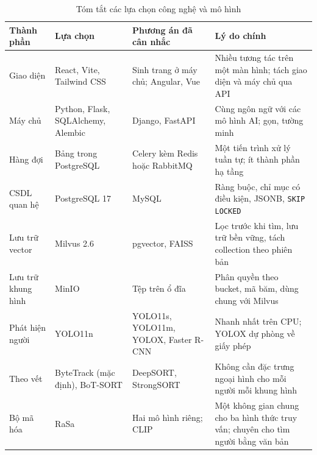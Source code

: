 \begin{table}[H]
\centering
\caption{Tóm tắt các lựa chọn công nghệ và mô hình}
\label{tab:tech-summary}
\begin{tabularx}{\textwidth}{|>{\raggedright\arraybackslash}p{3.0cm}|>{\raggedright\arraybackslash}p{3.1cm}|>{\raggedright\arraybackslash}p{3.4cm}|L|}
\hline
\textbf{Thành phần} & \textbf{Lựa chọn} & \textbf{Phương án đã cân nhắc} & \textbf{Lý do chính} \\
\hline
Giao diện & React, Vite, Tailwind CSS & Sinh trang ở máy chủ; Angular, Vue & Nhiều tương tác trên một màn hình; tách giao diện và máy chủ qua API \\
\hline
Máy chủ & Python, Flask, SQLAlchemy, Alembic & Django, FastAPI & Cùng ngôn ngữ với các mô hình AI; gọn, tường minh \\
\hline
Hàng đợi & Bảng trong PostgreSQL & Celery kèm Redis hoặc RabbitMQ & Một tiến trình xử lý tuần tự; ít thành phần hạ tầng \\
\hline
CSDL quan hệ & PostgreSQL 17 & MySQL & Ràng buộc, chỉ mục có điều kiện, JSONB, \texttt{SKIP LOCKED} \\
\hline
Lưu trữ vector & Milvus 2.6 & pgvector, FAISS & Lọc trước khi tìm, lưu trữ bền vững, tách collection theo phiên bản \\
\hline
Lưu trữ khung hình & MinIO & Tệp trên ổ đĩa & Phân quyền theo bucket, mã băm, dùng chung với Milvus \\
\hline
Phát hiện người & YOLO11n & YOLO11s, YOLO11m, YOLOX, Faster R-CNN & Nhanh nhất trên CPU; YOLOX dự phòng về giấy phép \\
\hline
Theo vết & ByteTrack (mặc định), BoT-SORT & DeepSORT, StrongSORT & Không cần đặc trưng ngoại hình cho mỗi người mỗi khung hình \\
\hline
Bộ mã hóa & RaSa & Hai mô hình riêng; CLIP & Một không gian chung cho ba hình thức truy vấn; chuyên cho tìm người bằng văn bản \\
\hline
\end{tabularx}
\end{table}
